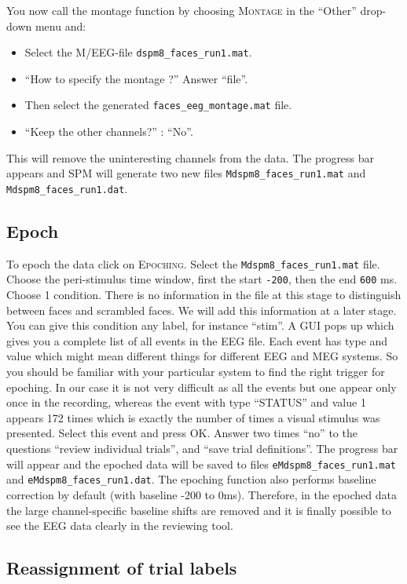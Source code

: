 You now call the montage function by choosing \textsc{Montage} in the ``Other'' drop-down menu and:
\begin{itemize}
\item Select the M/EEG-file \texttt{dspm8\_faces\_run1.mat}.
\item ``How to specify the montage ?'' Answer ``file''.
\item Then select the generated \texttt{faces\_eeg\_montage.mat} file.
\item ``Keep the other channels?'' : ``No''.
\end{itemize}
This will remove the uninteresting channels from the data. The progress bar appears and SPM will generate two new files \texttt{Mdspm8\_faces\_run1.mat} and \texttt{Mdspm8\_faces\_run1.dat}.

\subsection{Epoch}
To epoch the data click on \textsc{Epoching}. Select the \texttt{Mdspm8\_faces\_run1.mat} file. Choose the peri-stimulus time window, first the start \texttt{-200}, then the end \texttt{600} ms. Choose 1 condition. There is no information in the file at this stage to distinguish between faces and scrambled faces. We will add this information at a later stage. You can give this condition any label, for instance ``stim''. A GUI pops up which gives you a complete list of all events in the EEG file. Each event has type and value which might mean different things for different EEG and MEG systems. So you should be familiar with your particular system to find the right trigger for epoching. In our case it is not very difficult as all the events but one appear only once in the recording, whereas the event with type ``STATUS'' and value 1 appears 172 times which is exactly the number of times a visual stimulus was presented. Select this event and press OK. Answer two times ``no'' to the questions ``review individual trials'', and ``save trial definitions''. The progress bar will appear and the epoched data will be saved to files \texttt{eMdspm8\_faces\_run1.mat} and \texttt{eMdspm8\_faces\_run1.dat}. The epoching function also performs baseline correction by default (with baseline -200 to 0ms). Therefore, in the epoched data the large channel-specific baseline shifts are removed and it is finally possible to see the EEG data clearly in the reviewing tool.

\subsection{Reassignment of trial labels}

